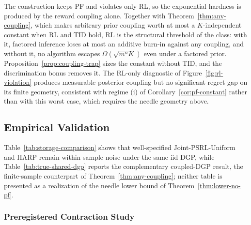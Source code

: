 \begin{remark}
\label{rem:lower-bound-scope}
The construction keeps PF and violates only RL, so the exponential hardness is produced by the reward coupling alone. Together with Theorem~\ref{thm:any-coupling}, which makes arbitrary prior coupling worth at most a $K$-independent constant when RL and TID hold, RL is the structural threshold of the class: with it, factored inference loses at most an additive burn-in against any coupling, and without it, no algorithm escapes $\Omega(\sqrt{m^nK})$ even under a factored prior. Proposition~\ref{prop:coupling-trap} sizes the constant without TID, and the discrimination bonus removes it. The RL-only diagnostic of Figure~\ref{fig:rl-violation} produces measurable posterior coupling but no significant regret gap on its finite geometry, consistent with regime (i) of Corollary~\ref{cor:pf-constant} rather than with this worst case, which requires the needle geometry above.
\end{remark}

\subsection{Empirical Validation}
\label{app:theory-empirical}
\label{sec:theory-sim}

Table~\ref{tab:storage-comparison} shows that well-specified Joint-PSRL-Uniform and HARP remain within sample noise under the same iid DGP, while Table~\ref{tab:true-shared-dgp} reports the complementary coupled-DGP result, the finite-sample counterpart of Theorem~\ref{thm:any-coupling}; neither table is presented as a realization of the needle lower bound of Theorem~\ref{thm:lower-no-pf}.

\subsubsection{Preregistered Contraction Study}
\label{app:contraction-study}

